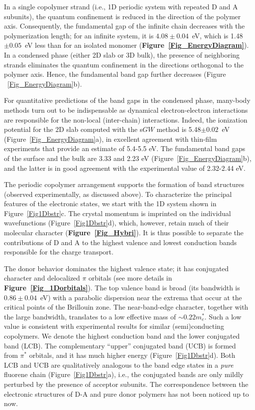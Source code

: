 \documentclass[journal = jpclcd]{achemso}
\begin{document}
In a single copolymer strand (i.e.,  1D periodic system with repeated D and A subunits),  the quantum confinement is reduced in the direction of the polymer axis. Consequently, the fundamental gap of the infinite chain decreases with the polymerization length; for an infinite system, it is $4.08 \pm0.04$~eV, which is 1.48$\pm0.05$~eV less than for an isolated monomer (\textbf{Figure~\ref{Fig_EnergyDiagram}}).  In a condensed phase (either 2D slab or 3D bulk), the presence of neighboring strands eliminates the quantum confinement in the directions orthogonal to the polymer axis. Hence, the fundamental band gap  further decreases (Figure ~\ref{Fig_EnergyDiagram}b).

For quantitative predictions of the band gaps in the condensed phase, many-body methods turn out to be indispensable as dynamical electron-electron interactions are responsible for the non-local (inter-chain) interactions. Indeed, the ionization potential for the 2D slab computed with the s$GW$ method is 5.48$\pm0.02$~eV (Figure~\ref{Fig_EnergyDiagram}a), in excellent agreement with thin-film experiments that provide an estimate of 5.4-5.5 eV.\cite{Mai2015} The fundamental band gaps of the surface and the bulk are 3.33 and 2.23 eV (Figure~\ref{Fig_EnergyDiagram}b), and the latter is in good agreement with the experimental value of 2.32-2.44 eV.\cite{Mai2015}

The periodic copolymer arrangement supports the formation of band structures (observed experimentally, as discussed above). To characterize the principal features of the electronic states, we start with the 1D system shown in Figure~\ref{Fig1Dbstr}c. The crystal momentum is imprinted on the individual wavefunctions (Figure~\ref{Fig1Dbstr}d), which, however, retain much of their molecular character  (\textbf{Figure~\ref{Fig_Hybri}}). It is thus possible to separate the contributions of D and A  to the highest valence and lowest conduction bands responsible for the charge transport. 

The donor behavior dominates the highest valence state; it has conjugated character and delocalized $\pi$ orbitals (see more details in \textbf{Figure~\ref{Fig_1Dorbitals}}).  The top valence band is broad (its bandwidth is $0.86\pm0.04$~eV) with a parabolic dispersion near the extrema that occur at the critical points of the Brillouin zone. The near-band-edge character, together with the large bandwidth, translates to a low effective mass of $\sim0.22 m^*_e$. Such a low value is consistent with experimental results for similar (semi)conducting copolymers.\cite{Hsu2015}  We denote the highest conduction band and the lower conjugated band (LCB). The complementary ``upper'' conjugated band (UCB) is formed from $\pi^*$ orbitals, and it has much higher energy  (Figure~\ref{Fig1Dbstr}d). Both LCB and UCB are qualitatively analogous to the  band edge states in a \emph{pure} fluorene chain (Figure~\ref{Fig1Dbstr}a), i.e., the conjugated bands are only mildly perturbed by the presence of acceptor subunits. The correspondence between the electronic structures of D-A and pure donor polymers has not been noticed up to now.
\end{document}
